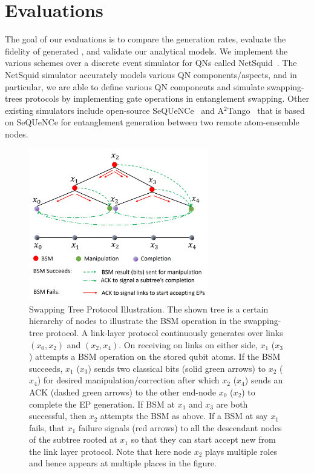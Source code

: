 \section{Evaluations}
\label{sec:swapping_eval}

The goal of our evaluations is to compare the \eps generation rates, evaluate
the fidelity of generated \epss, and validate our analytical models.
We implement the various schemes over a discrete event simulator 
for QNs called NetSquid~\cite{netsquid2020}. 
The NetSquid simulator accurately models various QN components/aspects, and
in particular, we are able to define various QN components and simulate swapping-trees protocols
by implementing gate operations in entanglement swapping.
Other existing simulators include open-source SeQUeNCe~\cite{sequence} and A$^2$Tango~\cite{ruilin2023} 
that is based on SeQUeNCe for entanglement generation between two remote atom-ensemble nodes.


\begin{figure}[ht]
    \centering
    \includegraphics[width=0.7\textwidth]{chapters/swappingtrees/figures/protocol.jpg}
  \caption{Swapping Tree Protocol Illustration.
  The shown tree is a certain hierarchy of nodes to illustrate the BSM operation in the swapping-tree protocol.  
  A link-layer protocol continuously generates \epss over links $(x_0, x_2)$ and $(x_2, x_4)$.
  On receiving \eps on links on either side, $x_1$ ($x_3$) attempts a BSM operation on the stored
  qubit atoms. If the BSM succeeds, $x_1$ ($x_3$) sends two classical bits (solid green arrows) to  $x_2$ ($x_4$) 
  for desired manipulation/correction after which $x_2$ ($x_4$) sends an ACK (dashed green arrows) to the other end-node $x_0$ ($x_2$) to complete the EP generation. If 
  BSM  at  $x_1$ and $x_3$ are both successful, then $x_2$ attempts the BSM as above. 
  If a BSM at say $x_1$ fails, that $x_1$ failure signals (red arrows) to all the descendant nodes of the subtree
  rooted at $x_1$ so that they can start accept new \epss from the link layer protocol. 
  Note that here node $x_2$ plays multiple roles and hence appears at multiple places in the figure.}
  \label{fig:swapping_protocol}
\end{figure}

